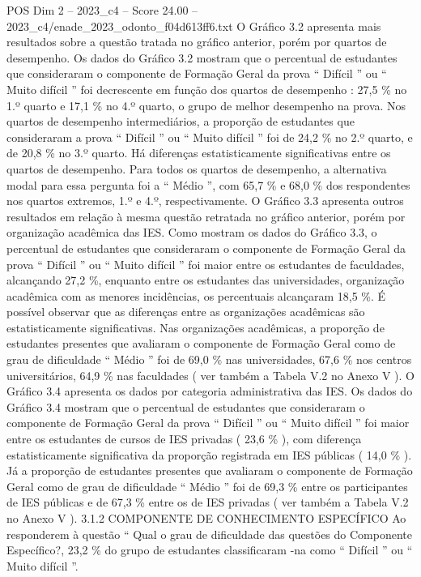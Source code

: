 \begin{textsample}{POS Dim 2 – 2023\_c4 – Score 24.00 – 2023\_c4/enade\_2023\_odonto\_f04d613ff6.txt}
O Gráfico 3.2 apresenta mais resultados sobre a questão tratada no gráfico anterior, porém por quartos de desempenho.
Os dados do Gráfico 3.2 mostram que o percentual de estudantes que consideraram o componente de Formação Geral da prova “ Difícil ” ou “ Muito difícil ” foi decrescente em função dos quartos de desempenho : 27,5 \% no 1.º quarto e 17,1 \% no 4.º quarto, o grupo de melhor desempenho na prova.
Nos quartos de desempenho intermediários, a proporção de estudantes que consideraram a prova “ Difícil ” ou “ Muito difícil ” foi de 24,2 \% no 2.º quarto, e de 20,8 \% no 3.º quarto.
Há diferenças estatisticamente significativas entre os quartos de desempenho.
Para todos os quartos de desempenho, a alternativa modal para essa pergunta foi a “ Médio ”, com 65,7 \% e 68,0 \% dos respondentes nos quartos extremos, 1.º e 4.º, respectivamente.
O Gráfico 3.3 apresenta outros resultados em relação à mesma questão retratada no gráfico anterior, porém por organização acadêmica das IES.
Como mostram os dados do Gráfico 3.3, o percentual de estudantes que consideraram o componente de Formação Geral da prova “ Difícil ” ou “ Muito difícil ” foi maior entre os estudantes de faculdades, alcançando 27,2 \%, enquanto entre os estudantes das universidades, organização acadêmica com as menores incidências, os percentuais alcançaram 18,5 \%.
É possível observar que as diferenças entre as organizações acadêmicas são estatisticamente significativas.
Nas organizações acadêmicas, a proporção de estudantes presentes que avaliaram o componente de Formação Geral como de grau de dificuldade “ Médio ” foi de 69,0 \% nas universidades, 67,6 \% nos centros universitários, 64,9 \% nas faculdades ( ver também a Tabela V.2 no Anexo V ).
O Gráfico 3.4 apresenta os dados por categoria administrativa das IES.
Os dados do Gráfico 3.4 mostram que o percentual de estudantes que consideraram o componente de Formação Geral da prova “ Difícil ” ou “ Muito difícil ” foi maior entre os estudantes de cursos de IES privadas ( 23,6 \% ), com diferença estatisticamente significativa da proporção registrada em IES públicas ( 14,0 \% ).
Já a proporção de estudantes presentes que avaliaram o componente de Formação Geral como de grau de dificuldade “ Médio ” foi de 69,3 \% entre os participantes de IES públicas e de 67,3 \% entre os de IES privadas ( ver também a Tabela V.2 no Anexo V ). 3.1.2 COMPONENTE DE CONHECIMENTO ESPECÍFICO Ao responderem à questão “ Qual o grau de dificuldade das questões do Componente Específico?, 23,2 \% do grupo de estudantes classificaram -na como “ Difícil ” ou “ Muito difícil ”.

\end{textsample}
